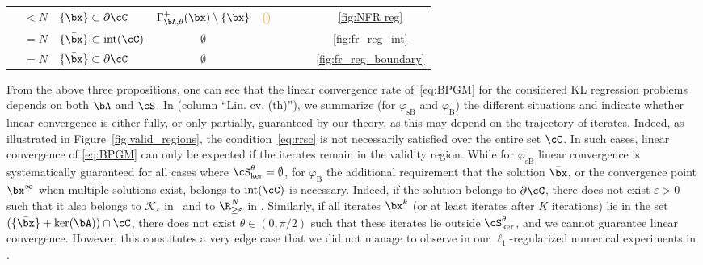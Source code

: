 \documentclass[11pt]{amsart}
\newcommand{\cmark}{\textcolor{darkgreen}{\ding{51}}}
\newcommand{\cmarkm}{\textcolor{darkorange}{(\ding{51})}}
\newcommand{\xmark}{\textcolor{darkred}{\ding{55}}}
\begin{document}
\begin{table}[t]
\begin{tabular}{cclcccccc}
& $<N$      & $\{\bar \bx \} \subset \partial \cC $ &  $\Gamma_{\bA,\theta}^+(\bar \bx) \setminus \{\bar \bx\}$ & \cmarkm & & \cmark & \xmark & \ref{fig:NFR reg}\\
& $=N$      & $\{\bar \bx \} \subset \mathrm{int}(\cC ) $ & $\emptyset$ & \cmark & \cmark & \cmark & \cmark & \ref{fig:fr_reg_int}\\
& $=N$   & $\{\bar \bx \} \subset \partial \cC  $  & $\emptyset$  &  \cmark  & & \cmark & \xmark & \ref{fig:fr_reg_boundary}\\
\bottomrule
\bottomrule
\end{tabular}
\end{table}

From the above three propositions, one can see that the linear convergence rate of~\eqref{eq:BPGM} for the considered KL regression problems depends on both $\bA$ and $\cS$. In  (column ``Lin. cv. (th)''), we summarize (for $\varphi_\mathrm{sB}$ and $\varphi_{\mathrm{B}}$) the different situations and indicate whether linear convergence is either fully, or only partially, guaranteed by our theory, as this may depend on the trajectory of iterates. Indeed, as illustrated in Figure~\ref{fig:valid_regions}, the condition~\eqref{eq:rrsc} is not necessarily satisfied over the entire set $\cC$.  In such cases, linear convergence of \eqref{eq:BPGM} can only be expected if the iterates remain in the validity region. While for $\varphi_\mathrm{sB}$ linear convergence is systematically guaranteed for all cases where $\cS^{\theta}_{\ker} = \emptyset$, for $\varphi_\mathrm{B}$ the additional requirement that the solution $\bar \bx$, or the convergence point $\bx^\infty$ when multiple solutions exist, belongs to $\mathrm{int}(\cC)$ is necessary. Indeed, if the solution belongs to $\partial \cC$, there does not exist $\varepsilon >0$ such that it also belongs to $\mathcal{K}_\varepsilon$ in~ and to $\R_{\geq \varepsilon}^N$ in . Similarly, if all iterates $\bx^k$ (or at least iterates after $K$ iterations) lie in the set $(\{\bar \bx\} + \ker(\bA))\cap \cC$, there does not exist $\theta \in (0,\pi/2)$ such that these iterates lie outside $\cS^{\theta}_{\ker}$, and we cannot guarantee linear convergence. However, this constitutes a very edge case that we did not manage to observe in our $\ell_1$-regularized numerical experiments in .
\end{document}
